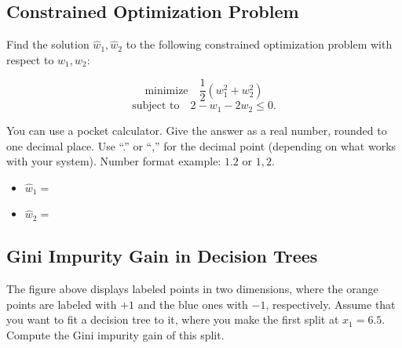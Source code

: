 \documentclass{article}
\begin{document}
\subsection*{Constrained Optimization Problem}

Find the solution \(\hat{w}_1, \hat{w}_2\) to the following constrained optimization problem with respect to \(w_1, w_2\):

\[
\text{minimize} \quad \frac{1}{2}(w_1^2 + w_2^2)
\]
\[
\text{subject to} \quad 2 - w_1 - 2w_2 \leq 0.
\]

You can use a pocket calculator. Give the answer as a real number, rounded to one decimal place. Use ``.'' or ``,'' for the decimal point (depending on what works with your system). Number format example: \(1.2\) or \(1,2\).

\begin{itemize}
    \item \(\hat{w}_1 =\)
    \item \(\hat{w}_2 =\)
\end{itemize}

\subsection*{Gini Impurity Gain in Decision Trees}

\begin{center}
\end{center}

The figure above displays labeled points in two dimensions, where the orange points are labeled with \(+1\) and the blue ones with \(-1\), respectively. Assume that you want to fit a decision tree to it, where you make the first split at \(x_1 = 6.5\). Compute the Gini impurity gain of this split.
\end{document}
